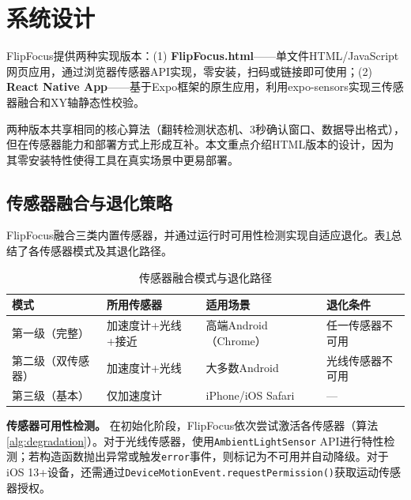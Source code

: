 \documentclass[12pt,a4paper]{ctexart}
\begin{document}
\section{系统设计}

FlipFocus提供两种实现版本：(1) \textbf{FlipFocus.html}——单文件HTML/JavaScript网页应用，通过浏览器传感器API实现，零安装，扫码或链接即可使用；(2) \textbf{React Native App}——基于Expo框架的原生应用，利用expo-sensors实现三传感器融合和XY轴静态性校验。

两种版本共享相同的核心算法（翻转检测状态机、3秒确认窗口、数据导出格式），但在传感器能力和部署方式上形成互补。本文重点介绍HTML版本的设计，因为其零安装特性使得工具在真实场景中更易部署。

\subsection{传感器融合与退化策略}

FlipFocus融合三类内置传感器，并通过运行时可用性检测实现自适应退化。表\ref{tab:sensor_tiers}总结了各传感器模式及其退化路径。

\begin{table}[H]
\centering
\caption{传感器融合模式与退化路径}
\label{tab:sensor_tiers}
\begin{tabular}{@{}p{2.5cm}p{2.5cm}p{2.5cm}p{3cm}@{}}
\toprule
\textbf{模式} & \textbf{所用传感器} & \textbf{适用场景} & \textbf{退化条件} \\
\midrule
第一级（完整） & 加速度计+光线+接近 & 高端Android（Chrome） & 任一传感器不可用 \\
第二级（双传感器）& 加速度计+光线 & 大多数Android & 光线传感器不可用 \\
第三级（基本） & 仅加速度计 & iPhone/iOS Safari & --- \\
\bottomrule
\end{tabular}
\end{table}

\textbf{传感器可用性检测。} 在初始化阶段，FlipFocus依次尝试激活各传感器（算法\ref{alg:degradation}）。对于光线传感器，使用\texttt{AmbientLightSensor} API进行特性检测；若构造函数抛出异常或触发\texttt{error}事件，则标记为不可用并自动降级。对于iOS 13+设备，还需通过\texttt{DeviceMotionEvent.requestPermission()}获取运动传感器授权。
\end{document}
